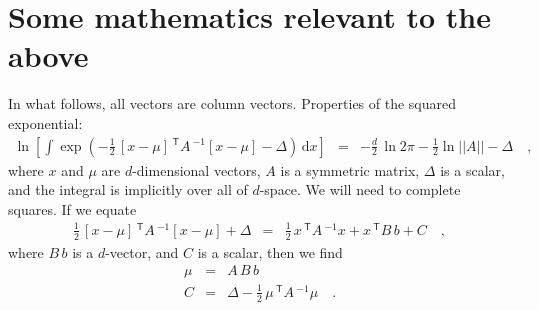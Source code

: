 \documentclass[manuscript, letterpaper]{aastex6}
\newcommand{\project}[1]{\textsl{#1}}
\newcommand{\acronym}[1]{{\small{#1}}}
\newcommand{\apogee}{\project{\acronym{APOGEE}}}
\newcommand{\dd}{\mathrm{d}}
\newcommand{\transp}[1]{{#1}^{\mathsf{T}}}
\newcommand{\inv}[1]{{#1}^{-1}}
\begin{document}




\appendix
\section{Some mathematics relevant to the above}

In what follows, all vectors are column vectors.
Properties of the squared exponential:
\begin{eqnarray}
  \ln\left[\int\exp(-\frac{1}{2}\,[x-\mu]\transp\,A\inv\,[x-\mu] - \Delta)\,\dd x\right]
  &=& -\frac{d}{2}\,\ln 2\pi -\frac{1}{2}\ln ||A|| -\Delta
  \quad ,
\end{eqnarray}
where $x$ and $\mu$ are $d$-dimensional vectors, $A$ is a symmetric
matrix, $\Delta$ is a scalar, and the integral is implicitly over all
of $d$-space.
We will need to complete squares.
If we equate
\begin{eqnarray}
  \frac{1}{2}\,[x-\mu]\transp\,A\inv\,[x-\mu] + \Delta
  &=& \frac{1}{2}\,x\transp\,A\inv\,x + x\transp\,B\,b + C
  \quad ,
\end{eqnarray}
where $B\,b$ is a $d$-vector, and $C$ is a scalar, then we find
\begin{eqnarray}
  \mu &=& A\,B\,b
  \\
  C & = & \Delta - \frac{1}{2}\,\mu\transp\,A\inv\,\mu
  \quad .
\end{eqnarray}
\end{document}
